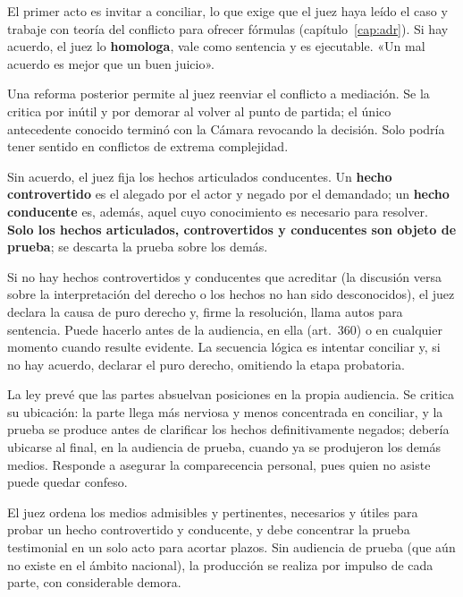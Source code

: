 \documentclass[12pt,oneside]{book}
\begin{document}
\begin{description}[leftmargin=0pt,style=nextline]
\item[Conciliación.] El primer acto es invitar a conciliar, lo que exige que el juez haya leído el caso y trabaje con teoría del conflicto para ofrecer fórmulas (capítulo~\ref{cap:adr}). Si hay acuerdo, el juez lo \textbf{homologa}, vale como sentencia y es ejecutable. «Un mal acuerdo es mejor que un buen juicio».
\item[Reenvío a mediación prejudicial.] Una reforma posterior permite al juez reenviar el conflicto a mediación. Se la critica por inútil y por demorar al volver al punto de partida; el único antecedente conocido terminó con la Cámara revocando la decisión. Solo podría tener sentido en conflictos de extrema complejidad.
\item[Fijación de hechos conducentes.] Sin acuerdo, el juez fija los hechos articulados conducentes. Un \textbf{hecho controvertido} es el alegado por el actor y negado por el demandado; un \textbf{hecho conducente} es, además, aquel cuyo conocimiento es necesario para resolver. \textbf{Solo los hechos articulados, controvertidos y conducentes son objeto de prueba}; se descarta la prueba sobre los demás.
\item[Puro derecho (art.~359).] Si no hay hechos controvertidos y conducentes que acreditar (la discusión versa sobre la interpretación del derecho o los hechos no han sido desconocidos), el juez declara la causa de puro derecho y, firme la resolución, llama autos para sentencia. Puede hacerlo antes de la audiencia, en ella (art.~360) o en cualquier momento cuando resulte evidente. La secuencia lógica es intentar conciliar y, si no hay acuerdo, declarar el puro derecho, omitiendo la etapa probatoria.
\item[Prueba confesional.] La ley prevé que las partes absuelvan posiciones en la propia audiencia. Se critica su ubicación: la parte llega más nerviosa y menos concentrada en conciliar, y la prueba se produce antes de clarificar los hechos definitivamente negados; debería ubicarse al final, en la audiencia de prueba, cuando ya se produjeron los demás medios. Responde a asegurar la comparecencia personal, pues quien no asiste puede quedar confeso.
\item[Ordenamiento de los medios de prueba.] El juez ordena los medios admisibles y pertinentes, necesarios y útiles para probar un hecho controvertido y conducente, y debe concentrar la prueba testimonial en un solo acto para acortar plazos. Sin audiencia de prueba (que aún no existe en el ámbito nacional), la producción se realiza por impulso de cada parte, con considerable demora.
\end{description}
\end{document}
